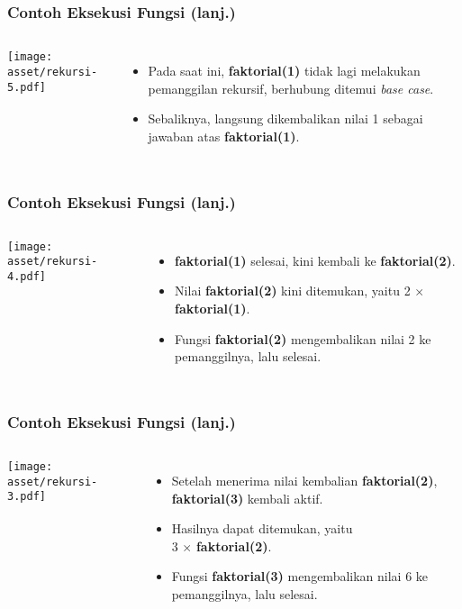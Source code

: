 \begin{frame}
\frametitle{Contoh Eksekusi Fungsi (lanj.)}
\begin{columns}
    \centering
    \texttt{[image: asset/rekursi-5.pdf]}
    \begin{itemize}
      \item Pada saat ini, \textbf{faktorial(1)} tidak lagi melakukan pemanggilan rekursif, berhubung ditemui \textit{base case}.
      \item Sebaliknya, langsung dikembalikan nilai 1 sebagai jawaban atas \textbf{faktorial(1)}.
    \end{itemize}
  \end{columns} 
\end{frame}

\begin{frame}
\frametitle{Contoh Eksekusi Fungsi (lanj.)}
\begin{columns}
    \centering
    \texttt{[image: asset/rekursi-4.pdf]}
    \begin{itemize}
      \item \textbf{faktorial(1)} selesai, kini kembali ke \textbf{faktorial(2)}.
      \item Nilai \textbf{faktorial(2)} kini ditemukan, yaitu 2 $\times$ \textbf{faktorial(1)}.
      \item Fungsi \textbf{faktorial(2)} mengembalikan nilai 2 ke pemanggilnya, lalu selesai.
    \end{itemize}
  \end{columns} 
\end{frame}

\begin{frame}
\frametitle{Contoh Eksekusi Fungsi (lanj.)}
\begin{columns}
    \centering
    \texttt{[image: asset/rekursi-3.pdf]}
    \begin{itemize}
      \item Setelah menerima nilai kembalian \textbf{faktorial(2)}, \textbf{faktorial(3)} kembali aktif.
      \item Hasilnya dapat ditemukan, yaitu \\ 3 $\times$ \textbf{faktorial(2)}.
      \item Fungsi \textbf{faktorial(3)} mengembalikan nilai 6 ke pemanggilnya, lalu selesai.
    \end{itemize}
  \end{columns} 
\end{frame}


